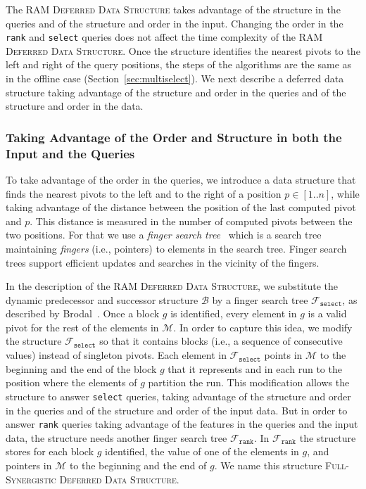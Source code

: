 The \textsc{RAM Deferred Data Structure} takes advantage of the
structure in the queries and of the structure and order in the
input. Changing the order in the \texttt{rank} and \texttt{select}
queries does not affect the time complexity of the \textsc{RAM
  Deferred Data Structure}. Once the structure identifies the nearest
pivots to the left and right of the query positions, the steps of the
algorithms are the same as in the offline case
(Section~\ref{sec:multiselect}). We next describe a deferred data
structure taking advantage of the structure and order in the queries
and of the structure and order in the data.

\subsubsection{Taking Advantage of the Order and Structure in both the Input and the Queries}

To take advantage of the order in the queries, we introduce a
data structure that finds the nearest pivots to the left and to the
right of a position $p\in[1..n]$, while taking advantage of the
distance between the position of the last computed pivot and $p$. This
distance is measured in the number of computed pivots between the two
positions. For that we use a \emph{finger search
  tree}~\cite{1998-SODA-FingerSearchTreesWithConstantInsertionTime-Brodal}
which is a search tree maintaining \emph{fingers} (i.e., pointers) to
elements in the search tree. Finger search trees support efficient
updates and searches in the vicinity of the
fingers.

In the description of the \textsc{RAM Deferred Data Structure}, we
substitute the dynamic predecessor and successor structure
$\mathcal{B}$ by a finger search tree $\mathcal{F}_{\texttt{select}}$,
as described by
Brodal~\cite{1998-SODA-FingerSearchTreesWithConstantInsertionTime-Brodal}. Once
a block $g$ is identified, every element in $g$ is a valid pivot for
the rest of the elements in $\mathcal{M}$. In order to capture this
idea, we modify the structure $\mathcal{F}_{\texttt{select}}$ so that
it contains blocks (i.e., a sequence of consecutive values) instead of
singleton pivots. Each element in $\mathcal{F}_{\texttt{select}}$
points in $\mathcal{M}$ to the beginning and the end of the block $g$
that it represents and in each run to the position where the elements
of $g$ partition the run. This modification allows the structure to
answer \texttt{select} queries, taking advantage of the structure and
order in the queries and of the structure and order of the input
data. But in order to answer \texttt{rank} queries taking advantage of
the features in the queries and the input data, the structure needs
another finger search tree $\mathcal{F}_{\texttt{rank}}$. In
$\mathcal{F}_{\texttt{rank}}$ the structure stores for each block $g$
identified, the value of one of the elements in $g$, and pointers in
$\mathcal{M}$ to the beginning and the end of $g$. We name this
structure \textsc{Full-Synergistic Deferred Data Structure}.

